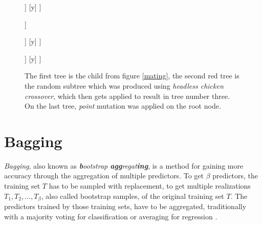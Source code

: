 \documentclass[tikz, runningheads]{llncs}
\begin{document}
\begin{figure}[htbp]
	\centering
	\begin{adjustbox}{valign=t}
		\begin{forest}
			[+
				[+
					[x]
					[1]
				]
				[y]	
			]
		\end{forest}
	\end{adjustbox}\qquad
	\begin{adjustbox}{valign=t}
		\begin{forest}
			[/, red subtree
				[1.44]
				[y]
			]
		\end{forest}
	\end{adjustbox}\qquad
	\begin{adjustbox}{valign=t}
		\begin{forest}
			[+
				[/, red subtree
					[1.44]
					[y]
				]	
				[y]
			]
		\end{forest}
	\end{adjustbox}\qquad
	\begin{adjustbox}{valign=t}
		\begin{forest}
			[\textcolor{blue}{*}
				[+
					[x]
					[1]
				]
				[y]	
			]
		\end{forest}
	\end{adjustbox}
	\caption{The first tree is the child from figure \ref{mating}, the second red tree is the random subtree which was produced 
	using \textit{headless chicken crossover}, which then gets applied to result in tree number three. On the last tree, 
	\textit{point} mutation was applied on the root node.} \label{mutation}
\end{figure}

\section{Bagging}
\label{sectionBagging}
\textit{Bagging}, also known as \textit{\textbf{b}ootstrap \textbf{agg}regat\textbf{ing}}, is a method for gaining 
more accuracy through the aggregation of multiple predictors. To get $\beta$ predictors, 
the training set $T$ has to be sampled with 
replacement, to get multiple realizations $T_1, T_2, ..., T_\beta$, also called bootstrap samples, of the original training set $T$. 
The predictors trained by those training sets, have to be aggregated, traditionally with a majority voting 
for classification or averaging for regression \cite{bagging}. 
\end{document}
